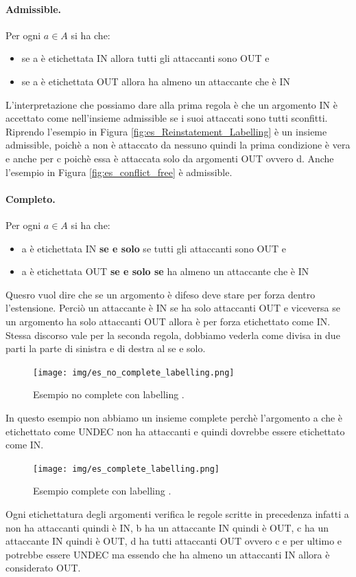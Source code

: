 \paragraph{Admissible.}
Per ogni $a \in A$ si ha che:
\begin{itemize}
    \item se a è etichettata IN allora tutti gli attaccanti sono OUT e
    \item se a è etichettata OUT allora ha almeno un attaccante che è IN
\end{itemize}
L'interpretazione che possiamo dare alla prima regola è che un argomento IN è accettato come nell'insieme admissible se i suoi attaccati sono tutti sconfitti.
Riprendo l'esempio in Figura \ref{fig:es_Reinstatement_Labelling} è un insieme admissible, poichè a non è attaccato da nessuno quindi la prima condizione è vera e anche per c poichè essa è attaccata solo da argomenti OUT ovvero d. Anche l'esempio in Figura \ref{fig:es_conflict_free} è admissible.

\paragraph{Completo.}
Per ogni $a \in A$ si ha che:
\begin{itemize}
    \item a è etichettata IN \textbf{se e solo} se tutti gli attaccanti sono OUT e
    \item a è etichettata OUT\textbf{ se e solo se} ha almeno un attaccante che è IN
\end{itemize}
Quesro vuol dire che se un argomento è difeso deve stare per forza dentro l'estensione. Perciò un attaccante è IN se ha solo attaccanti OUT e viceversa se un argomento ha solo attaccanti OUT allora è per forza etichettato come IN. Stessa discorso vale per la seconda regola, dobbiamo vederla come divisa in due parti la parte di sinistra e di destra al se e solo. 

\begin{figure}[H]
    \centering
    \texttt{[image: img/es\_no\_complete\_labelling.png]}
    \caption{Esempio no complete con labelling .}\label{fig:es_no_complete_labelling}
\end{figure}
In questo esempio non abbiamo un insieme complete perchè l'argomento a che è etichettato come UNDEC non ha attaccanti e quindi dovrebbe essere etichettato come IN.

\begin{figure}[H]
    \centering
    \texttt{[image: img/es\_complete\_labelling.png]}
    \caption{Esempio  complete con labelling .}\label{fig:es_no_complete_labelling}
\end{figure}
Ogni etichettatura degli argomenti verifica le regole scritte in precedenza infatti a non ha attaccanti quindi è IN, b ha un attaccante IN quindi è OUT, c ha un attaccante IN quindi è OUT, d ha tutti attaccanti OUT ovvero c e per ultimo e potrebbe essere UNDEC ma essendo che ha almeno un attaccanti IN allora è considerato OUT.

